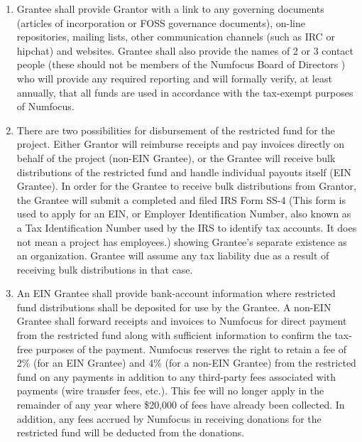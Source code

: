 \documentclass[english,letterpaper,12pt]{article}
\begin{document}
\begin{enumerate}

\item Grantee shall provide Grantor with a link to any governing documents (articles of incorporation or FOSS governance documents), on-line repositories, mailing lists, other communication channels (such as IRC or hipchat) and websites.   Grantee shall also provide the names of 2 or 3 contact people (these should not be members of the Numfocus Board of Directors ) who will provide any required reporting and will formally verify, at least annually, that all funds are used in accordance with the tax-exempt purposes of Numfocus. 


\item There are two possibilities for disbursement of the restricted fund for the project.   Either Grantor will reimburse receipts and pay invoices directly on behalf of the project (non-EIN Grantee), or the Grantee will receive bulk distributions of the restricted fund and handle individual payouts itself (EIN Grantee).   In order for the Grantee to receive bulk distributions from Grantor, the Grantee will submit a completed and filed IRS Form SS-4 (This form is used to apply for an EIN, or Employer Identification Number, also known as a Tax Identification Number used by the IRS to identify tax accounts. It does not mean a project has employees.) showing Grantee's separate existence as an organization.   Grantee will assume any tax liability due as a result of receiving bulk distributions in that case. 

\item An EIN Grantee shall provide bank-account information where restricted fund distributions shall be deposited for use by the Grantee.  A non-EIN Grantee shall forward receipts and invoices to Numfocus for direct payment from the restricted fund along with sufficient information to confirm the tax-free purposes of the payment.   Numfocus reserves the right to retain a fee of 2\% (for an EIN Grantee) and 4\% (for a non-EIN Grantee) from the restricted fund on any payments in addition to any third-party fees associated with payments (wire transfer fees, etc.).  This fee will no longer apply in the remainder of any year where \$20,000 of fees have already been collected.   In addition, any fees accrued by Numfocus in receiving donations for the restricted fund will be deducted from the donations. 


\end{enumerate}
\end{document}
